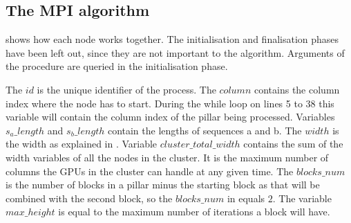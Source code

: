 \begin{algorithm}
\begin{algorithmic}[1]
    \label{MPIalg:functionifbegin}
         \label{MPIalg:diagonal_size}
        \Indent \label{MPIalg:copymem}
            \EndIndent
        \Statex
        \Indent \label{MPIalg:writecol1}
            \EndIndent
        \Indent \label{MPIalg:writecol2}
            \EndIndent
    \Else
         \label{MPIalg:writecol3}
        \Indent \label{MPIalg:writecol4}
            \EndIndent
    \EndIf\label{MPIalg:functionifend}
    \Statex{\hspace{0.6cm}\vdots}
      \label{MPIalg:readcol}
\EndFunction \label{MPIalg:functionend}
\end{algorithmic}
\end{algorithm}

\subsection{The MPI algorithm}
 shows how each node works together.
The initialisation and finalisation phases have been left out, since they are not important to the algorithm.
Arguments of the procedure are queried in the initialisation phase.

The $id$ is the unique identifier of the process.
The $column$ contains the column index where the node has to start. During the while loop on lines 5 to 38 this variable will contain the column index of the pillar being processed.
Variables $s_a\_length$ and $s_b\_length$ contain the lengths of sequences a and b.
The $width$ is the width as explained in .
Variable $cluster\_total\_width$ contains the sum of the width variables of all the nodes in the cluster.
It is the maximum number of columns the GPUs in the cluster can handle at any given time.
The $blocks\_num$ is the number of blocks in a pillar minus the starting block as that will be combined with the second block, so the $blocks\_num$ in  equals $2$.
The variable $max\_height$ is equal to the maximum number of iterations a block will have.

